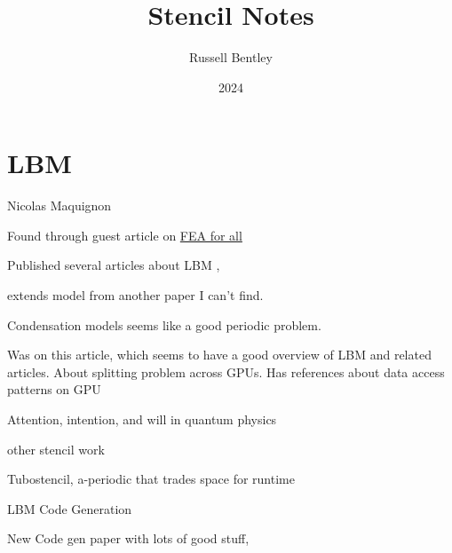 \documentclass{beamer}
\title{Stencil Notes}
\author{Russell Bentley}
\institute{Stony Brook}
\date{2024}
\begin{document}
\frame{\titlepage}

\section{LBM}
\begin{frame}{Nicolas Maquignon}
  \begin{outline}
    \1 Found through guest article on 
    \href{https://feaforall.com/implementation-lattice-boltzmann-method-lbm/}{FEA for all}

    \1 Published several articles about LBM \cite{Maquignon2014}, \cite{Maquignon2022}

    \2 \cite{Maquignon2014} extends model from another paper I can't find.
      
    \2 Condensation models seems like a good periodic problem.

    \1 Was on this article, which seems to have a good overview of LBM and related articles. 
    About splitting problem across GPUs.
    Has references about data access patterns on GPU
    \cite{Duchateau2015}
  \end{outline}
\end{frame}

\begin{frame}
  \begin{outline}
    \1 Attention, intention, and will in quantum physics \cite{Stapp1999}
  \end{outline}
\end{frame}

\begin{frame}{other stencil work}
  \begin{outline}
    \1 Tubostencil, a-periodic that trades space for runtime \cite{Liu2023turbo}
  \end{outline}
\end{frame}

\begin{frame}{LBM Code Generation}
  \begin{outline}
    \1 New Code gen paper with lots of good stuff, \cite{Suffa2024}
  \end{outline}
\end{frame}
\end{document}
